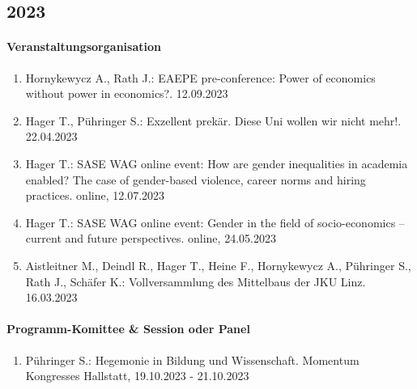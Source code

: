 \subsection*{2023}
\paragraph{Veranstaltungsorganisation}
\begin{enumerate}[leftmargin=*, labelsep=0.5cm]
\item Hornykewycz A., Rath J.: EAEPE pre-conference: Power of economics without power in economics?. 12.09.2023
\item Hager T., Pühringer S.: Exzellent prekär. Diese Uni wollen wir nicht mehr!. 22.04.2023
\item Hager T.: SASE WAG online event: How are gender inequalities in academia enabled? The case of gender-based violence, career norms and hiring practices. online, 12.07.2023
\item Hager T.: SASE WAG online event: Gender in the field of socio-economics – current and future perspectives. online, 24.05.2023
\item Aistleitner M., Deindl R., Hager T., Heine F., Hornykewycz A., Pühringer S., Rath J., Schäfer K.: Vollversammlung des Mittelbaus der JKU Linz. 16.03.2023
\end{enumerate}

\paragraph{Programm-Komittee \& Session oder Panel}
\begin{enumerate}[leftmargin=*, labelsep=0.5cm]
\item Pühringer S.: Hegemonie in Bildung und Wissenschaft. Momentum Kongresses Hallstatt, 19.10.2023 - 21.10.2023
\end{enumerate}

